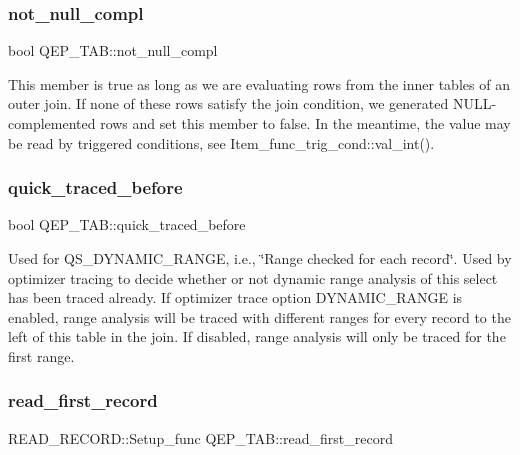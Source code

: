 \subsubsection{\texorpdfstring{not\+\_\+null\+\_\+compl}{not\_null\_compl}}
{\footnotesize\ttfamily bool Q\+E\+P\+\_\+\+T\+A\+B\+::not\+\_\+null\+\_\+compl}

This member is true as long as we are evaluating rows from the inner tables of an outer join. If none of these rows satisfy the join condition, we generated N\+U\+LL-\/complemented rows and set this member to false. In the meantime, the value may be read by triggered conditions, see Item\+\_\+func\+\_\+trig\+\_\+cond\+::val\+\_\+int(). \mbox{\label{classQEP__TAB_a27b20c80a18d0ddea41aab12759e4c65}} 
\subsubsection{\texorpdfstring{quick\+\_\+traced\+\_\+before}{quick\_traced\_before}}
{\footnotesize\ttfamily bool Q\+E\+P\+\_\+\+T\+A\+B\+::quick\+\_\+traced\+\_\+before}

Used for Q\+S\+\_\+\+D\+Y\+N\+A\+M\+I\+C\+\_\+\+R\+A\+N\+GE, i.\+e., \char`\"{}\+Range checked for each record\char`\"{}. Used by optimizer tracing to decide whether or not dynamic range analysis of this select has been traced already. If optimizer trace option D\+Y\+N\+A\+M\+I\+C\+\_\+\+R\+A\+N\+GE is enabled, range analysis will be traced with different ranges for every record to the left of this table in the join. If disabled, range analysis will only be traced for the first range. \mbox{\label{classQEP__TAB_ac2ce8d99bd715a7459b1451786f1b07b}} 
\subsubsection{\texorpdfstring{read\+\_\+first\+\_\+record}{read\_first\_record}}
{\footnotesize\ttfamily R\+E\+A\+D\+\_\+\+R\+E\+C\+O\+R\+D\+::\+Setup\+\_\+func Q\+E\+P\+\_\+\+T\+A\+B\+::read\+\_\+first\+\_\+record}

